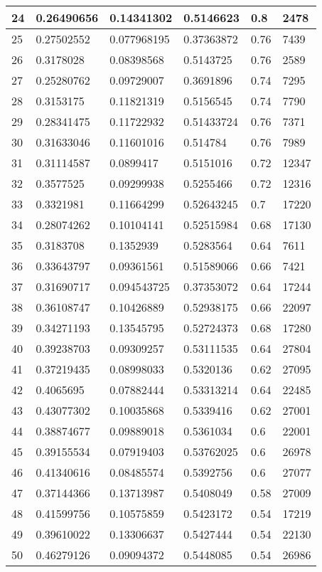 \begin{longtable}{|l|l|l|l|l|l|}
24 & 0.26490656 & 0.14341302 & 0.5146623 & 0.8 & 2478 \\ \hline 
25 & 0.27502552 & 0.077968195 & 0.37363872 & 0.76 & 7439 \\ \hline 
26 & 0.3178028 & 0.08398568 & 0.5143725 & 0.76 & 2589 \\ \hline 
27 & 0.25280762 & 0.09729007 & 0.3691896 & 0.74 & 7295 \\ \hline 
28 & 0.3153175 & 0.11821319 & 0.5156545 & 0.74 & 7790 \\ \hline 
29 & 0.28341475 & 0.11722932 & 0.51433724 & 0.76 & 7371 \\ \hline 
30 & 0.31633046 & 0.11601016 & 0.514784 & 0.76 & 7989 \\ \hline 
31 & 0.31114587 & 0.0899417 & 0.5151016 & 0.72 & 12347 \\ \hline 
32 & 0.3577525 & 0.09299938 & 0.5255466 & 0.72 & 12316 \\ \hline 
33 & 0.3321981 & 0.11664299 & 0.52643245 & 0.7 & 17220 \\ \hline 
34 & 0.28074262 & 0.10104141 & 0.52515984 & 0.68 & 17130 \\ \hline 
35 & 0.3183708 & 0.1352939 & 0.5283564 & 0.64 & 7611 \\ \hline 
36 & 0.33643797 & 0.09361561 & 0.51589066 & 0.66 & 7421 \\ \hline 
37 & 0.31690717 & 0.094543725 & 0.37353072 & 0.64 & 17244 \\ \hline 
38 & 0.36108747 & 0.10426889 & 0.52938175 & 0.66 & 22097 \\ \hline 
39 & 0.34271193 & 0.13545795 & 0.52724373 & 0.68 & 17280 \\ \hline 
40 & 0.39238703 & 0.09309257 & 0.53111535 & 0.64 & 27804 \\ \hline 
41 & 0.37219435 & 0.08998033 & 0.5320136 & 0.62 & 27095 \\ \hline 
42 & 0.4065695 & 0.07882444 & 0.53313214 & 0.64 & 22485 \\ \hline 
43 & 0.43077302 & 0.10035868 & 0.5339416 & 0.62 & 27001 \\ \hline 
44 & 0.38874677 & 0.09889018 & 0.5361034 & 0.6 & 22001 \\ \hline 
45 & 0.39155534 & 0.07919403 & 0.53762025 & 0.6 & 26978 \\ \hline 
46 & 0.41340616 & 0.08485574 & 0.5392756 & 0.6 & 27077 \\ \hline 
47 & 0.37144366 & 0.13713987 & 0.5408049 & 0.58 & 27009 \\ \hline 
48 & 0.41599756 & 0.10575859 & 0.5423172 & 0.54 & 17219 \\ \hline 
49 & 0.39610022 & 0.13306637 & 0.5427444 & 0.54 & 22130 \\ \hline 
50 & 0.46279126 & 0.09094372 & 0.5448085 & 0.54 & 26986 \\ \hline 
\end{longtable}